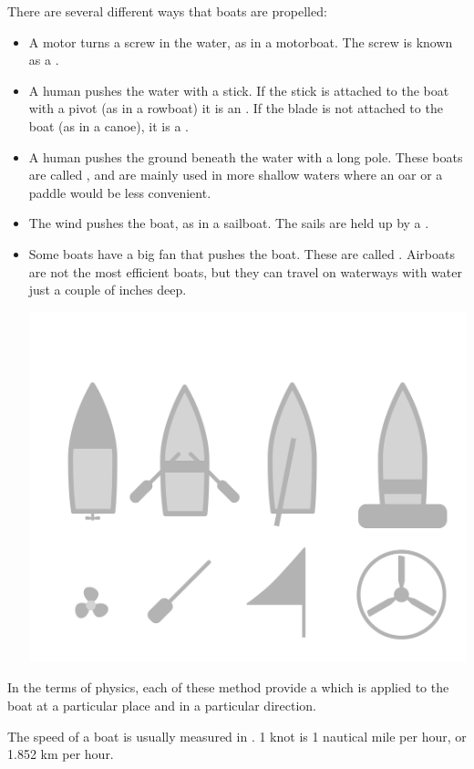 There are several different ways that boats are propelled:

\begin{itemize}


\item A motor turns a screw in the water, as in a motorboat. The screw is known as a .

\item A human pushes the water with a stick.  If the stick is attached to the boat with a pivot (as in a rowboat) it is an .  If the blade is not attached to the boat (as in a canoe), it is a .

\item A human pushes the ground beneath the water with a long pole. These boats are called , and are mainly used in more shallow waters where an oar or a paddle would be less convenient.

\item The wind pushes the boat,  as in a sailboat. The sails are held up by a .

\item Some boats have a big fan that pushes the boat.  These are called .   Airboats are not the most efficient boats,  but they can travel
on waterways with water just a couple of inches deep.

\includegraphics[width=.75\textwidth]{boatTypes.png}


\end{itemize}

In the terms of physics, each of these method provide a  which is applied to the boat at a particular place and in a particular direction.

The speed of a boat is usually measured in . 1 knot is 1 nautical mile per hour, or 1.852 km per hour.

